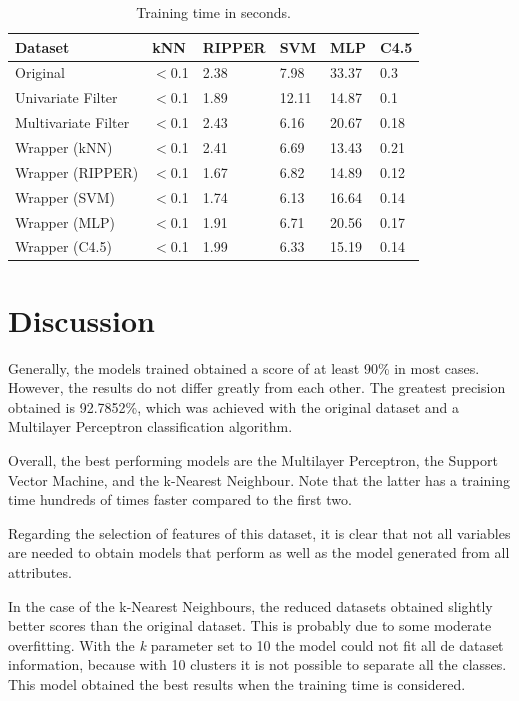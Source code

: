 \documentclass[a4paper,11pt]{article}
\begin{document}
\begin{table}[h]
\centering
\begin{tabular}{||l|l|l|l|l|l||}
	\hline
	Dataset & kNN & RIPPER & SVM & MLP & C4.5\\
	\hline
	Original & $<$0.1 & 2.38 & 7.98 & 33.37 & 0.3\\
	Univariate Filter & $<$0.1 & 1.89 & 12.11 & 14.87 & 0.1\\
	Multivariate Filter & $<$0.1 & 2.43 & 6.16 & 20.67 & 0.18\\
	Wrapper (kNN) & $<$0.1 & 2.41 & 6.69 & 13.43 & 0.21\\
	Wrapper (RIPPER) & $<$0.1 & 1.67 & 6.82 & 14.89 & 0.12\\
	Wrapper (SVM) & $<$0.1 & 1.74 & 6.13 & 16.64 & 0.14\\
	Wrapper (MLP) & $<$0.1 & 1.91 & 6.71 & 20.56 & 0.17\\
	Wrapper (C4.5) & $<$0.1 & 1.99 & 6.33 & 15.19 & 0.14\\
    \hline 
\end{tabular}
\caption{Training time in seconds.}
\label{tab:table7}
\end{table}

\section{Discussion}
\label{sec:discussion}

Generally, the models trained obtained a score of at least 90\% in most cases. However, the results do not differ greatly from each other. The greatest precision obtained is 92.7852\%, which was achieved with the original dataset and a Multilayer Perceptron classification algorithm.

Overall, the best performing models are the Multilayer Perceptron, the Support Vector Machine, and the k-Nearest Neighbour. Note that the latter has a training time hundreds of times faster compared to the first two.

Regarding the selection of features of this dataset, it is clear that not all variables are needed to obtain models that perform as well as the model generated from all attributes.

In the case of the k-Nearest Neighbours, the reduced datasets obtained slightly better scores than the original dataset. This is probably due to some moderate overfitting. With the \textit{k} parameter set to 10 the model could not fit all de dataset information, because with 10 clusters it is not possible to separate all the classes. This model obtained the best results when the training time is considered.
\end{document}

